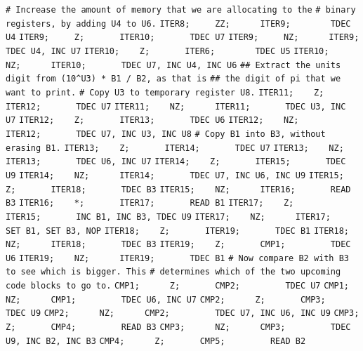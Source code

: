 \begin{apgsembly}
	\centering
	\begin{minipage}[t]{.49\textwidth}
		\begin{algorithmic}\tiny
			\State \verb|# Increase the amount of memory that we are allocating to the|
			\State \verb|# binary registers, by adding U4 to U6.|
			\State \verb|ITER8;     ZZ;      ITER9;        TDEC U4|
			\State \verb|ITER9;     Z;       ITER10;       TDEC U7|
			\State \verb|ITER9;     NZ;      ITER9;        TDEC U4, INC U7|
			\State \verb|ITER10;    Z;       ITER6;        TDEC U5|
			\State \verb|ITER10;    NZ;      ITER10;       TDEC U7, INC U4, INC U6|
			\State \verb||
			\State \verb|## Extract the units digit from (10^U3) * B1 / B2, as that is|
			\State \verb|## the digit of pi that we want to print.|
			\State \verb|# Copy U3 to temporary register U8.|
			\State \verb|ITER11;    Z;       ITER12;       TDEC U7|
			\State \verb|ITER11;    NZ;      ITER11;       TDEC U3, INC U7|
			\State \verb|ITER12;    Z;       ITER13;       TDEC U6|
			\State \verb|ITER12;    NZ;      ITER12;       TDEC U7, INC U3, INC U8|
			\State \verb||
			\State \verb|# Copy B1 into B3, without erasing B1.|
			\State \verb|ITER13;    Z;       ITER14;       TDEC U7|
			\State \verb|ITER13;    NZ;      ITER13;       TDEC U6, INC U7|
			\State \verb|ITER14;    Z;       ITER15;       TDEC U9|
			\State \verb|ITER14;    NZ;      ITER14;       TDEC U7, INC U6, INC U9|
			\State \verb|ITER15;    Z;       ITER18;       TDEC B3|
			\State \verb|ITER15;    NZ;      ITER16;       READ B3|
			\State \verb|ITER16;    *;       ITER17;       READ B1|
			\State \verb|ITER17;    Z;       ITER15;       INC B1, INC B3, TDEC U9|
			\State \verb|ITER17;    NZ;      ITER17;       SET B1, SET B3, NOP|
			\State \verb|ITER18;    Z;       ITER19;       TDEC B1|
			\State \verb|ITER18;    NZ;      ITER18;       TDEC B3|
			\State \verb|ITER19;    Z;       CMP1;         TDEC U6|
			\State \verb|ITER19;    NZ;      ITER19;       TDEC B1|
			\State \verb||
			\State \verb|# Now compare B2 with B3 to see which is bigger. This|
			\State \verb|# determines which of the two upcoming code blocks to go to.|
			\State \verb|CMP1;      Z;       CMP2;         TDEC U7|
			\State \verb|CMP1;      NZ;      CMP1;         TDEC U6, INC U7|
			\State \verb|CMP2;      Z;       CMP3;         TDEC U9|
			\State \verb|CMP2;      NZ;      CMP2;         TDEC U7, INC U6, INC U9|
			\State \verb|CMP3;      Z;       CMP4;         READ B3|
			\State \verb|CMP3;      NZ;      CMP3;         TDEC U9, INC B2, INC B3|
			\State \verb|CMP4;      Z;       CMP5;         READ B2|

\end{algorithmic}
\end{minipage}
\end{apgsembly}
